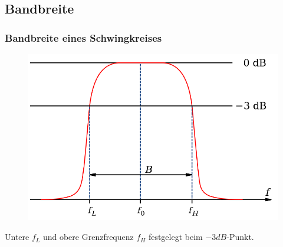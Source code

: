 


\subsection*{Bandbreite}
\begin{frame}
  \frametitle{Bandbreite eines Schwingkreises}
  \begin{center}
    \begin{figure}
      \includegraphics[width=\textwidth,height=.6\textheight,keepaspectratio]{a04/bandwidth.png}
    \end{figure}
  \end{center}
  Untere $f_L$ und obere Grenzfrequenz $f_H$ festgelegt beim $-3dB$-Punkt.
\end{frame}

